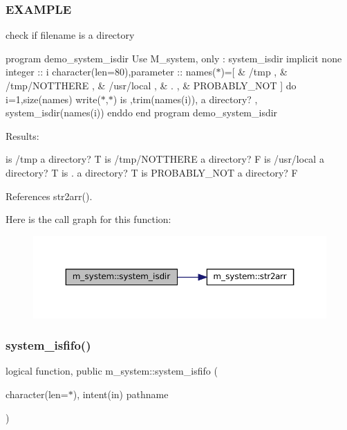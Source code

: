 \subsubsection*{E\+X\+A\+M\+P\+LE}

check if filename is a directory

program demo\+\_\+system\+\_\+isdir Use M\+\_\+system, only \+: system\+\_\+isdir implicit none integer \+:\+: i character(len=80),parameter \+:\+: names($\ast$)=\mbox{[} \& \textquotesingle{}/tmp \textquotesingle{}, \& \textquotesingle{}/tmp/\+N\+O\+T\+T\+H\+E\+RE \textquotesingle{}, \& \textquotesingle{}/usr/local \textquotesingle{}, \& \textquotesingle{}. \textquotesingle{}, \& \textquotesingle{}P\+R\+O\+B\+A\+B\+L\+Y\+\_\+\+N\+OT \textquotesingle{}\mbox{]} do i=1,size(names) write($\ast$,$\ast$)\textquotesingle{} is \textquotesingle{},trim(names(i)),\textquotesingle{} a directory? \textquotesingle{}, system\+\_\+isdir(names(i)) enddo end program demo\+\_\+system\+\_\+isdir

Results\+:

is /tmp a directory? T is /tmp/\+N\+O\+T\+T\+H\+E\+RE a directory? F is /usr/local a directory? T is . a directory? T is P\+R\+O\+B\+A\+B\+L\+Y\+\_\+\+N\+OT a directory? F 

References str2arr().

Here is the call graph for this function\+:
\nopagebreak
\begin{figure}[H]
\begin{center}
\leavevmode
\includegraphics[width=350pt]{namespacem__system_ad097988a031e64b4f21f856cf45c9c73_cgraph}
\end{center}
\end{figure}
\mbox{\label{namespacem__system_acbcaa0c5075ca103815f441ee410e1a3}} 
\subsubsection{\texorpdfstring{system\+\_\+isfifo()}{system\_isfifo()}}
{\footnotesize\ttfamily logical function, public m\+\_\+system\+::system\+\_\+isfifo (\begin{DoxyParamCaption}\item[{character(len=$\ast$), intent(in)}]{pathname }\end{DoxyParamCaption})}



